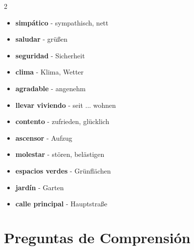 \documentclass[12pt,a4paper]{article}
\begin{document}
\begin{multicols}{2}
\begin{itemize}[leftmargin=*]
    \item \textbf{simpático} - sympathisch, nett
    \item \textbf{saludar} - grüßen
    \item \textbf{seguridad} - Sicherheit
    \item \textbf{clima} - Klima, Wetter
    \item \textbf{agradable} - angenehm
    \item \textbf{llevar viviendo} - seit ... wohnen
    \item \textbf{contento} - zufrieden, glücklich
    \item \textbf{ascensor} - Aufzug
    \item \textbf{molestar} - stören, belästigen
    \item \textbf{espacios verdes} - Grünflächen
    \item \textbf{jardín} - Garten
    \item \textbf{calle principal} - Hauptstraße
\end{itemize}
\end{multicols}

\newpage

\section*{Preguntas de Comprensión}
\end{document}
